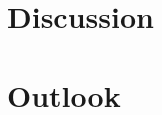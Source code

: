 \documentclass{article}
\begin{document}
\section{Discussion}


\section{Outlook} 



{
% 

}
\end{document}
